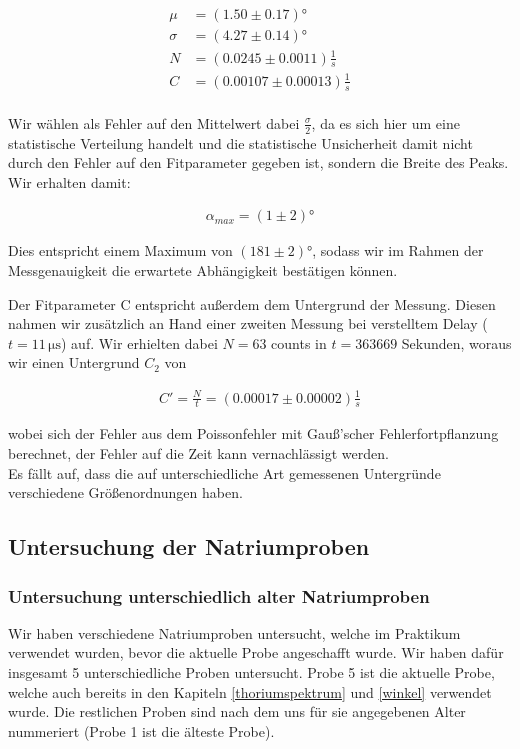 \documentclass[12pt,listof=totoc]{scrartcl}
\begin{document}
\begin{align*}
\mu &= (1.50 \pm 0.17) °\\
\sigma &= (4.27 \pm 0.14) °\\
N &= (0.0245 \pm 0.0011) \frac{1}{s}\\
C &= (0.00107 \pm 0.00013)\frac{1}{s}\\
\end{align*}

Wir wählen als Fehler auf den Mittelwert dabei $\frac{\sigma}{2}$, da es sich hier um eine statistische Verteilung handelt und die statistische Unsicherheit damit nicht durch den Fehler auf den Fitparameter gegeben ist, sondern die Breite des Peaks. Wir erhalten damit:

\begin{align}
\alpha_{max} = (1 \pm 2)°
\end{align}

Dies entspricht einem Maximum von $(181 \pm 2)°$, sodass wir im Rahmen der Messgenauigkeit die erwartete Abhängigkeit bestätigen können.

Der Fitparameter C entspricht außerdem dem Untergrund der Messung.
Diesen nahmen wir zusätzlich an Hand einer zweiten Messung bei verstelltem Delay ($t=11\,\mathrm{\mu s}$) auf. Wir erhielten dabei $N=63$ counts in $t=363669$  Sekunden, woraus wir einen Untergrund $C_2$ von 

\begin{align}
C' = \frac{N}{t} = ( 0.00017 \pm 0.00002) \frac{1}{s} 
\end{align} 

wobei sich der Fehler aus dem Poissonfehler mit Gauß'scher Fehlerfortpflanzung berechnet, der Fehler auf die Zeit kann vernachlässigt werden. \\
Es fällt auf, dass die auf unterschiedliche Art gemessenen Untergründe verschiedene Größenordnungen haben.

\newpage
\subsection{Untersuchung der Natriumproben}
\subsubsection{Untersuchung unterschiedlich alter Natriumproben}\label{alter}
Wir haben verschiedene Natriumproben untersucht, welche im Praktikum verwendet wurden, bevor die aktuelle Probe angeschafft wurde. Wir haben dafür insgesamt 5 unterschiedliche Proben untersucht. Probe 5 ist die aktuelle Probe, welche auch bereits in den Kapiteln \ref{thoriumspektrum} und \ref{winkel} verwendet wurde. Die restlichen Proben sind nach dem uns für sie angegebenen Alter nummeriert (Probe 1 ist die älteste Probe).
\end{document}

